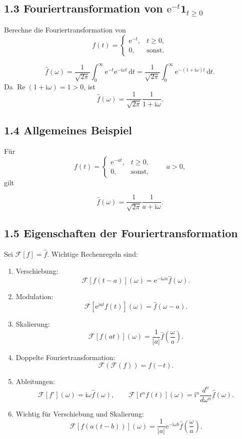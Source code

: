 \documentclass[11pt,a4paper]{article}
\newcommand{\ii}{\mathrm i}
\newcommand{\ee}{\mathrm e}
\newcommand{\dd}{\,\mathrm d}
\newcommand{\Ree}{\operatorname{Re}}
\begin{document}
\subsection{1.3 Fouriertransformation von $\ee^{-t}\mathbf 1_{t\ge0}$}
\begin{beispielbox}
Berechne die Fouriertransformation von
\[
f(t)=\begin{cases}\ee^{-t},&t\ge0,\\0,&\text{sonst.}\end{cases}
\]
\end{beispielbox}
\[
\widehat f(\omega)=\frac1{\sqrt{2\pi}}\int_0^{\infty}\ee^{-t}\ee^{-\ii\omega t}\dd t
=\frac1{\sqrt{2\pi}}\int_0^{\infty}\ee^{-(1+\ii\omega)t}\dd t.
\]
Da $\Ree(1+\ii\omega)=1>0$, ist
\[
\widehat f(\omega)=\frac1{\sqrt{2\pi}}\frac1{1+\ii\omega}.
\]

\subsection{1.4 Allgemeines Beispiel}
Für
\[
f(t)=\begin{cases}\ee^{-at},&t\ge0,\\0,&\text{sonst,}\end{cases}
\qquad a>0,
\]
gilt
\begin{importantbox}
\[
\widehat f(\omega)=\frac1{\sqrt{2\pi}}\frac1{a+\ii\omega}.
\]
\end{importantbox}

\subsection{1.5 Eigenschaften der Fouriertransformation}
Sei $\mathcal F[f]=\widehat f$. Wichtige Rechenregeln sind:
\begin{importantbox}
\begin{enumerate}[label=\arabic*.]
\item Verschiebung:
\[
\mathcal F[f(t-a)](\omega)=\ee^{-\ii\omega a}\widehat f(\omega).
\]
\item Modulation:
\[
\mathcal F[\ee^{\ii a t}f(t)](\omega)=\widehat f(\omega-a).
\]
\item Skalierung:
\[
\mathcal F[f(at)](\omega)=\frac1{|a|}\widehat f\left(\frac{\omega}{a}\right).
\]
\item Doppelte Fouriertransformation:
\[
\mathcal F(\mathcal F(f))=f(-t).
\]
\item Ableitungen:
\[
\mathcal F[f'](\omega)=\ii\omega\widehat f(\omega),
\qquad
\mathcal F[t^nf(t)](\omega)=\ii^n\frac{d^n}{d\omega^n}\widehat f(\omega).
\]
\item Wichtig für Verschiebung und Skalierung:
\[
\mathcal F[f(a(t-b))](\omega)=\frac1{|a|}\ee^{-\ii\omega b}\widehat f\left(\frac{\omega}{a}\right).
\]
\end{enumerate}
\end{importantbox}
\end{document}
